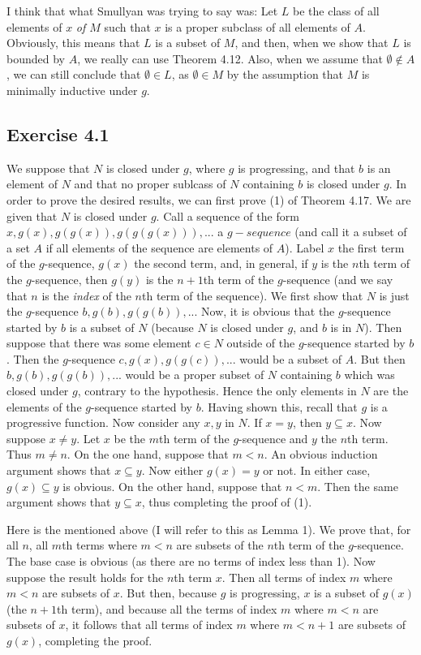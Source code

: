 \documentclass{article}
\theoremstyle{definition}
\begin{document}
I think that what Smullyan was trying to say was: Let $L$ be the class of all elements of $x$ \textit{of $M$} such that $x$ is a proper subclass of all 
elements of $A$. Obviously, this means that $L$ is a subset of $M$, and then, when we show that $L$ is bounded by $A$, we really can use Theorem 4.12. Also, when we assume 
that $\emptyset\notin A$, we can still conclude that $\emptyset\in L$, as $\emptyset\in M$ by the assumption that $M$ is minimally inductive under $g$. 


\subsection*{Exercise 4.1}
We suppose that $N$ is closed under $g$, where $g$ is progressing, and that $b$ is an element of $N$ and that no proper sublcass of $N$ containing $b$ is closed under 
$g$. In order to prove the desired results, we can first prove (1) of Theorem 4.17. We are given that $N$ is closed under $g$. Call a sequence of the form 
$x,g(x),g(g(x)),g(g(g(x))),...$ a $g-sequence$ (and call it a subset of a set $A$ if all elements of the sequence are elements of $A$). 
Label $x$ the first term of the $g$-sequence, $g(x)$ the second term, and, in general, if $y$ is the $n$th term of the $g$-sequence, then $g(y)$ is the 
$n+1$th term of the $g$-sequence (and we say that $n$ is the \textit{index} of the $n$th term of the sequence).
We first show that $N$ is just the $g$-sequence $b,g(b),g(g(b)),...$ Now, it is obvious that the $g$-sequence started by $b$ is a subset of $N$ (because 
$N$ is closed under $g$, and $b$ is in $N$). Then suppose that there was some element $c\in N$ outside of the $g$-sequence started by $b$. Then the 
$g$-sequence
$c,g(x),g(g(c)),...$ would be a subset of $A$. But then $b,g(b),g(g(b)),...$ would be a proper subset of $N$ containing $b$ which was closed under $g$, contrary to the 
hypothesis. Hence the only elements in $N$ are the elements of the $g$-sequence started by $b$. Having shown this, recall that $g$ is a progressive function. Now consider 
any $x,y$ in $N$. If $x=y$, then $y\subseteq x$. Now suppose $x\ne y$. Let $x$ be the $m$th term of the $g$-sequence and $y$ the $n$th term. Thus $m\ne n$. On the one hand, 
suppose that $m<n$. An obvious induction argument shows that $x\subseteq y$. Now either $g(x)=y$ or not. In either case, $g(x)\subseteq y$ is obvious. On the other hand, 
suppose that $n<m$. Then the same argument shows that $y\subseteq x$, thus completing the proof of (1). 


Here is the  mentioned above (I will refer to this as Lemma 1). 
We prove that, for all $n$, all $m$th terms where $m<n$ are subsets of the $n$th term of the 
$g$-sequence. The base case is obvious (as there are no terms of index less than 1). Now suppose the result holds for the $n$th term $x$. Then all terms of index $m$ where 
$m<n$ are subsets of $x$. But then, because $g$ is progressing, $x$ is a subset of $g(x)$ (the $n+1$th term), and because all the terms of index $m$ where 
$m<n$ are subsets of $x$, it follows that all terms of index $m$ where $m<n+1$ are subsets of $g(x)$, completing the proof.
\end{document}
